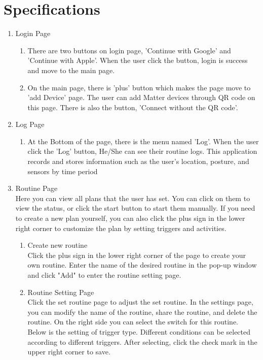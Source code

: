 \documentclass[11pt, conference]{IEEEtran}
\begin{document}
\section{\Large{Specifications}}
\begin{enumerate}[label=\arabic*]
    \item {\large{Login Page}}
    \begin{enumerate}[label=\alph*]
        \item There are two buttons on login page, 'Continue with Google' and 'Continue with Apple'. When the user click the button, login is success and move to the main page.
        \item On the main page, there is 'plus' button which makes the page move to 'add Device' page. The user can add Matter devices through QR code on this page. There is also the button, 'Connect without the QR code'. 
    \end{enumerate}
    \item {\large{Log Page}}
    \begin{enumerate}[label=\alph*]
        \item At the Bottom of the page, there is the menu named 'Log'. When the user click the 'Log' button, He/She can see their routine logs. This application records and stores information such as the user's location, posture, and sensors by time period 
    \end{enumerate}
    \item {\large{Routine Page}}\\
    Here you can view all plans that the user has set. You can click on them to view the status, or click the start button to start them manually. If you need to create a new plan yourself, you can also click the plus sign in the lower right corner to customize the plan by setting triggers and activities.\\
    \begin{enumerate}[label=\alph*]
        \item Create new routine\\
            Click the plus sign in the lower right corner of the page to create your own routine. Enter the name of the desired routine in the pop-up window and click "Add" to enter the routine setting page.\\
        \item Routine Setting Page\\
            Click the set routine page to adjust the set routine. In the settings page, you can modify the name of the routine, share the routine, and delete the routine. On the right side you can select the switch for this routine. Below is the setting of trigger type. Different conditions can be selected according to different triggers. After selecting, click the check mark in the upper right corner to save.\\

\end{enumerate}
\end{enumerate}
\end{document}
